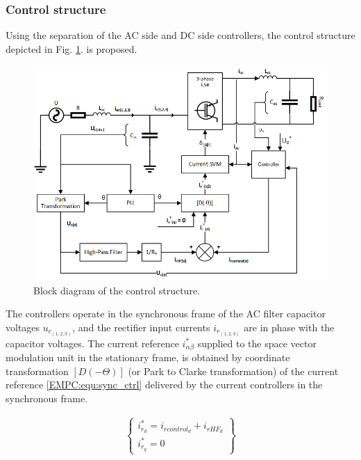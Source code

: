 \subsubsection{Control structure}\label{EMPC:sec:ControlStruct}

    Using the separation of the AC side and DC side controllers, the control structure depicted in Fig. \ref{EMPC:fig:ControlStruct}. is proposed.

    \begin{figure}[!ht]
        \centering
        \includegraphics[width=\textwidth]{EMPC_PNG_Pics/ControlStructure.png}
        \caption{Block diagram of the control structure.}
        \label{EMPC:fig:ControlStruct}
    \end{figure}

    The controllers operate in the synchronous frame of the AC filter capacitor voltages $u_{c_{(1,2,3)}}$, and the rectifier input currents $i_{r_{(1,2,3)}}$ are in phase with the capacitor voltages.
    The current reference $i^*_{\alpha\beta}$ supplied to the space vector modulation unit in the stationary frame, is obtained by coordinate transformation $[D(-\Theta)]$ (or Park to Clarke transformation) of the current reference \ref{EMPC:equ:sync_ctrl} delivered by the current controllers in the synchronous frame.

    \begin{equation}
        \begin{array}{rcl}
            \begin{Bmatrix}
                i^*_{r_d}=i_{rcontrol_d}+i_{rHF_d}\\
                i^*_{r_q}=0
            \end{Bmatrix}
        \end{array}
        \label{EMPC:equ:sync_ctrl}
    \end{equation}

